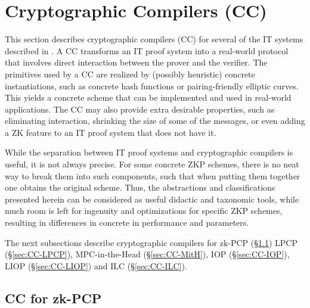 \section{Cryptographic Compilers (CC)} %
\label{paradigms:CC}

This section describes cryptographic compilers (CC) for several of the IT systems described in .
A CC transforms an IT proof system into a real-world protocol that involves direct interaction between the prover and the verifier. 
The primitives used by a CC are realized by (possibly heuristic) concrete instantiations, such as concrete hash functions or pairing-friendly elliptic curves.
This yields a concrete scheme that can be implemented and used in real-world applications.
The CC may also provide extra desirable properties, such as eliminating interaction, shrinking the size of some of the messages, or even adding a ZK feature to an IT proof system that does not have it.


\label{par:paradigms:background:abstract-vs-concrete}
While the separation between IT proof systems and cryptographic compilers is useful, it is not always precise. 
For some concrete ZKP schemes, there is no neat way to break them into such components, such that when putting them together one obtains the original scheme.%
Thus, the abstractions and classifications presented herein can be considered as useful didactic and taxonomic tools, while much room is left for ingenuity and optimizations for specific ZKP schemes, resulting in differences in concrete in performance and parameters.


The next subsections describe cryptographic compilers for 
zk-PCP (\S\ref{label:CC:zk-PCP})
LPCP (\S\ref{sec:CC-LPCP}),
MPC-in-the-Head (\S\ref{sec:CC-MitH}), 
IOP (\S\ref{sec:CC-IOP}), 
LIOP (\S\ref{sec:CC-LIOP}) and
ILC (\S\ref{sec:CC-ILC}).




\subsection{CC for zk-PCP} 
\label{label:CC:zk-PCP}

